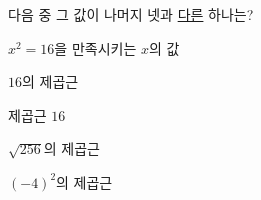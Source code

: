 다음 중 그 값이 나머지 넷과 \underline{다른} 하나는?
\begin{choicesii}{\rule[-3ex]{0pt}{8ex}$x^2=16$을 만족시키는 $x$의 값}{\rule[-3ex]{0pt}{8ex}$16$의 제곱근}{\rule[-3ex]{0pt}{8ex}제곱근 $16$}{\rule[-3ex]{0pt}{8ex}$\sqrt{256}$의 제곱근}{\rule[-3ex]{0pt}{8ex}$(-4)^2$의 제곱근}\end{choicesii}

